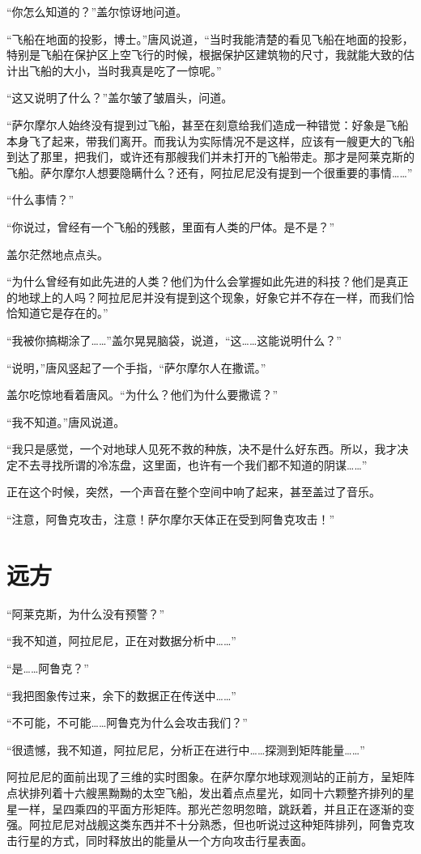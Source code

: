 “你怎么知道的？”盖尔惊讶地问道。

“飞船在地面的投影，博士。”唐风说道，“当时我能清楚的看见飞船在地面的投影，特别是飞船在保护区上空飞行的时候，根据保护区建筑物的尺寸，我就能大致的估计出飞船的大小，当时我真是吃了一惊呢。”

“这又说明了什么？”盖尔皱了皱眉头，问道。

“萨尔摩尔人始终没有提到过飞船，甚至在刻意给我们造成一种错觉：好象是飞船本身飞了起来，带我们离开。而我认为实际情况不是这样，应该有一艘更大的飞船到达了那里，把我们，或许还有那艘我们并未打开的飞船带走。那才是阿莱克斯的飞船。萨尔摩尔人想要隐瞒什么？还有，阿拉尼尼没有提到一个很重要的事情……”

“什么事情？”

“你说过，曾经有一个飞船的残骸，里面有人类的尸体。是不是？”

盖尔茫然地点点头。

“为什么曾经有如此先进的人类？他们为什么会掌握如此先进的科技？他们是真正的地球上的人吗？阿拉尼尼并没有提到这个现象，好象它并不存在一样，而我们恰恰知道它是存在的。”

“我被你搞糊涂了……”盖尔晃晃脑袋，说道，“这……这能说明什么？”

“说明，”唐风竖起了一个手指，“萨尔摩尔人在撒谎。”

盖尔吃惊地看着唐风。“为什么？他们为什么要撒谎？”

“我不知道。”唐风说道。

“我只是感觉，一个对地球人见死不救的种族，决不是什么好东西。所以，我才决定不去寻找所谓的冷冻盘，这里面，也许有一个我们都不知道的阴谋……”

正在这个时候，突然，一个声音在整个空间中响了起来，甚至盖过了音乐。

“注意，阿鲁克攻击，注意！萨尔摩尔天体正在受到阿鲁克攻击！”

\chapter{远方}

“阿莱克斯，为什么没有预警？”

“我不知道，阿拉尼尼，正在对数据分析中……”

“是……阿鲁克？”

“我把图象传过来，余下的数据正在传送中……”

“不可能，不可能……阿鲁克为什么会攻击我们？”

“很遗憾，我不知道，阿拉尼尼，分析正在进行中……探测到矩阵能量……”

阿拉尼尼的面前出现了三维的实时图象。在萨尔摩尔地球观测站的正前方，呈矩阵点状排列着十六艘黑黝黝的太空飞船，发出着点点星光，如同十六颗整齐排列的星星一样，呈四乘四的平面方形矩阵。那光芒忽明忽暗，跳跃着，并且正在逐渐的变强。阿拉尼尼对战舰这类东西并不十分熟悉，但也听说过这种矩阵排列，阿鲁克攻击行星的方式，同时释放出的能量从一个方向攻击行星表面。

